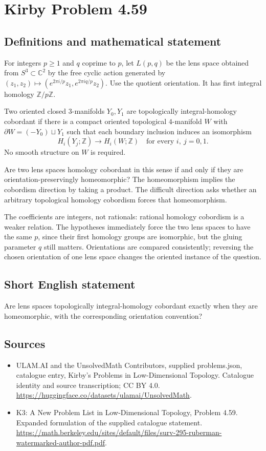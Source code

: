 \documentclass[11pt,a4paper]{article}
\begin{document}
\section*{Kirby Problem 4.59}\label{statement}

\subsection{Definitions and mathematical statement}
For integers $p\ge1$ and $q$ coprime to $p$, let $L(p,q)$ be the
lens space obtained from $S^3\subset\mathbb C^2$ by the free cyclic
action generated by
$(z_1,z_2)\mapsto(e^{2\pi i/p}z_1,e^{2\pi iq/p}z_2)$.
Use the quotient orientation. It has first integral homology
$\mathbb Z/p\mathbb Z$.

Two oriented closed $3$-manifolds $Y_0,Y_1$ are topologically
integral-homology cobordant if there is a compact oriented topological
$4$-manifold $W$ with $\partial W=(-Y_0)\sqcup Y_1$ such that
each boundary inclusion induces an isomorphism
\[
 H_i(Y_j;\mathbb Z)\longrightarrow H_i(W;\mathbb Z)
          \quad\text{for every }i,\ j=0,1.
\]
No smooth structure on $W$ is required.

Are two lens spaces homology cobordant in this sense if and only
if they are orientation-preservingly homeomorphic? The homeomorphism
implies the cobordism direction by taking a product. The difficult
direction asks whether an arbitrary topological homology cobordism
forces that homeomorphism.

The coefficients are integers, not rationals: rational homology
cobordism is a weaker relation. The hypotheses immediately force the
two lens spaces to have the same $p$, since their first homology
groups are isomorphic, but the gluing parameter $q$ still matters.
Orientations are compared consistently; reversing the chosen orientation
of one lens space changes the oriented instance of the question.
\subsection{Short English statement}
Are lens spaces topologically integral-homology cobordant exactly when they are homeomorphic, with the corresponding orientation convention?
\subsection{Sources}
\begin{itemize}
\item[S1] ULAM.AI and the UnsolvedMath Contributors, supplied problems.json, catalogue entry, Kirby's Problems in Low-Dimensional Topology. Catalogue identity and source transcription; CC BY 4.0.
\url{https://huggingface.co/datasets/ulamai/UnsolvedMath}.
\item[S2] K3: A New Problem List in Low-Dimensional Topology, Problem 4.59. Expanded formulation of the supplied catalogue statement.
\url{https://math.berkeley.edu/sites/default/files/surv-295-ruberman-watermarked-author-pdf.pdf}.
\end{itemize}
\end{document}
